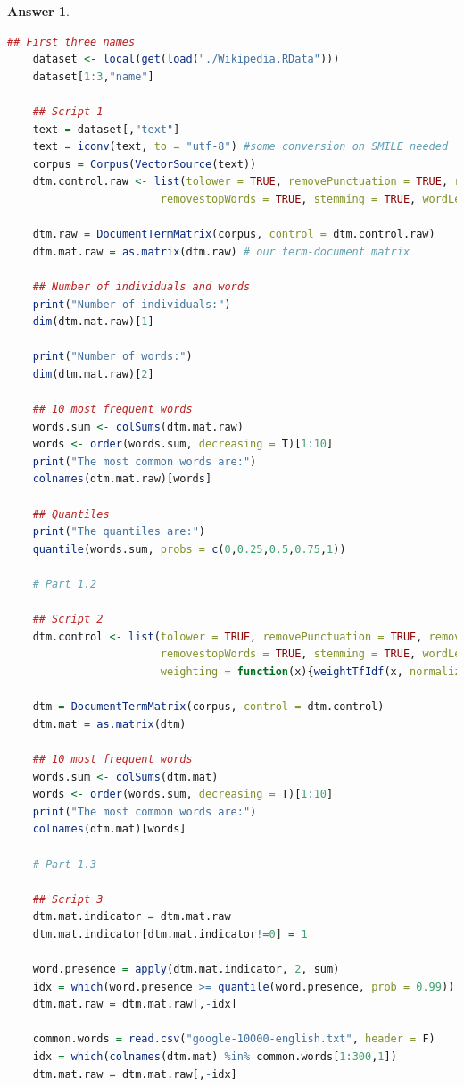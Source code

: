 \documentclass[12pt]{article}
\theoremstyle{colon}
\newtheorem*{answer}{Answer}
\begin{document}
\begin{answer}
\begin{lstlisting}[language=R, basicstyle=\scriptsize, breaklines=true]
    ## First three names
    dataset <- local(get(load("./Wikipedia.RData")))
    dataset[1:3,"name"]

    ## Script 1
    text = dataset[,"text"]
    text = iconv(text, to = "utf-8") #some conversion on SMILE needed
    corpus = Corpus(VectorSource(text))
    dtm.control.raw <- list(tolower = TRUE, removePunctuation = TRUE, removeNumbers = TRUE,
                        removestopWords = TRUE, stemming = TRUE, wordLengths = c(3, 15), bounds = list(global = c(2, Inf)))

    dtm.raw = DocumentTermMatrix(corpus, control = dtm.control.raw)
    dtm.mat.raw = as.matrix(dtm.raw) # our term-document matrix

    ## Number of individuals and words
    print("Number of individuals:")
    dim(dtm.mat.raw)[1]

    print("Number of words:")
    dim(dtm.mat.raw)[2]

    ## 10 most frequent words
    words.sum <- colSums(dtm.mat.raw)
    words <- order(words.sum, decreasing = T)[1:10]
    print("The most common words are:")
    colnames(dtm.mat.raw)[words]

    ## Quantiles
    print("The quantiles are:")
    quantile(words.sum, probs = c(0,0.25,0.5,0.75,1))

    # Part 1.2

    ## Script 2
    dtm.control <- list(tolower = TRUE, removePunctuation = TRUE, removeNumbers = TRUE,
                        removestopWords = TRUE, stemming = TRUE, wordLengths = c(3, 15), bounds = list(global = c(2, Inf)),
                        weighting = function(x){weightTfIdf(x, normalize = FALSE)})

    dtm = DocumentTermMatrix(corpus, control = dtm.control)
    dtm.mat = as.matrix(dtm)

    ## 10 most frequent words
    words.sum <- colSums(dtm.mat)
    words <- order(words.sum, decreasing = T)[1:10]
    print("The most common words are:")
    colnames(dtm.mat)[words]

    # Part 1.3

    ## Script 3
    dtm.mat.indicator = dtm.mat.raw
    dtm.mat.indicator[dtm.mat.indicator!=0] = 1

    word.presence = apply(dtm.mat.indicator, 2, sum)
    idx = which(word.presence >= quantile(word.presence, prob = 0.99))
    dtm.mat.raw = dtm.mat.raw[,-idx]

    common.words = read.csv("google-10000-english.txt", header = F)
    idx = which(colnames(dtm.mat) %in% common.words[1:300,1])
    dtm.mat.raw = dtm.mat.raw[,-idx]


\end{lstlisting}
\end{answer}
\end{document}
